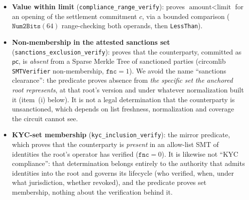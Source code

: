 \documentclass[11pt]{article}
\newcommand{\code}[1]{\texttt{#1}}
\begin{document}
\begin{itemize}
\item \textbf{Value within limit} (\code{compliance\_range\_verify}): proves
$\text{amount} < \text{limit}$ for an opening of the settlement commitment $c$,
via a bounded comparison ($\code{Num2Bits}(64)$ range-checking both operands,
then \code{LessThan}).
\item \textbf{Non-membership in the attested sanctions set}
(\code{sanctions\_exclusion\_verify}): proves that the counterparty, committed as
$\mathsf{pc}$, is \emph{absent} from a Sparse Merkle Tree of sanctioned parties
(circomlib \code{SMTVerifier} non-membership, $\code{fnc}=1$). We avoid the name
``sanctions clearance'': the predicate proves absence from \emph{the specific
set the anchored root represents}, at that root's version and under whatever
normalization built it (item~(i) below). It is not a legal determination that
the counterparty is unsanctioned, which depends on list freshness,
normalization and coverage the circuit cannot see.
\item \textbf{KYC-set membership} (\code{kyc\_inclusion\_verify}): the mirror
predicate, which proves that the counterparty is \emph{present} in an allow-list
SMT of identities the root's operator has verified ($\code{fnc}=0$). It is
likewise not ``KYC compliance'': that determination belongs entirely to the
authority that admits identities into the root and governs its lifecycle (who
verified, when, under what jurisdiction, whether revoked), and the predicate
proves set membership, nothing about the verification behind it.
\end{itemize}
\end{document}

